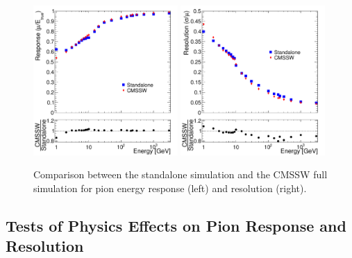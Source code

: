 \begin{figure}[hbtp]
\begin{center}
\includegraphics[width=0.49\textwidth]{figures/hcal_mu_comp_tot.pdf}
\includegraphics[width=0.49\textwidth]{figures/hcal_sigma_comp_tot.pdf}
\caption{Comparison between the standalone simulation and the CMSSW full simulation for pion energy response (left) and resolution (right).}
\label{fig:valplots}
\end{center}
\end{figure}

\subsection{Tests of Physics Effects on Pion Response and Resolution}
\label{sec:newdettests}

